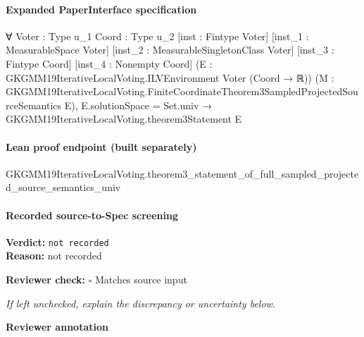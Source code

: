 \documentclass[10pt]{article}
\newcommand{\reviewerbox}{%
  \par\noindent\fbox{\parbox{0.96\linewidth}{\rule{0pt}{0.38in}}}\par
}
\newcommand{\reviewmatch}[1]{%
  \par\noindent\textbf{Reviewer check:} $\square$\; #1\par
  \noindent\emph{If left unchecked, explain the discrepancy or uncertainty below.}\par
}
\begin{document}
\paragraph{Expanded PaperInterface specification}
\begin{ReviewVerbatim}
∀ {Voter : Type u_1} {Coord : Type u_2} [inst : Fintype Voter] [inst_1 : MeasurableSpace Voter]
  [inst_2 : MeasurableSingletonClass Voter] [inst_3 : Fintype Coord] [inst_4 : Nonempty Coord]
  (E : GKGMM19IterativeLocalVoting.ILVEnvironment Voter (Coord → ℝ))
  (M : GKGMM19IterativeLocalVoting.FiniteCoordinateTheorem3SampledProjectedSourceSemantics E),
  E.solutionSpace = Set.univ → GKGMM19IterativeLocalVoting.theorem3Statement E
\end{ReviewVerbatim}

\paragraph{Lean proof endpoint (built separately)}\begin{ReviewVerbatim}
GKGMM19IterativeLocalVoting.theorem3_statement_of_full_sampled_projected_source_semantics_univ
\end{ReviewVerbatim}

\paragraph{Recorded source-to-Spec screening}
\textbf{Verdict:} \texttt{not recorded}
\\
\textbf{Reason:} not recorded
\reviewmatch{Matches source input}
\noindent\textbf{Reviewer annotation}\par
\reviewerbox
\end{document}
